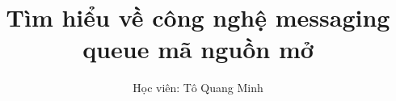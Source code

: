 \documentclass[a4paper, 14pt]{article} %
\begin{document}
\title{Tìm hiểu về công nghệ messaging queue mã nguồn mở}
\author{Học viên: Tô Quang Minh}
\maketitle
\flushleft






\end{document}
